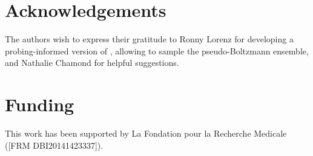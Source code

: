 \documentclass[a4,center,fleqn]{NAR}
\begin{document}
\section*{Acknowledgements}
The authors wish to express their gratitude to Ronny Lorenz for developing a probing-informed version of , allowing to sample the pseudo-Boltzmann ensemble, and Nathalie Chamond for helpful suggestions.

\section*{Funding}
This work has been supported by La Fondation pour la Recherche Medicale ([FRM
DBI20141423337]).
%


\end{document}
